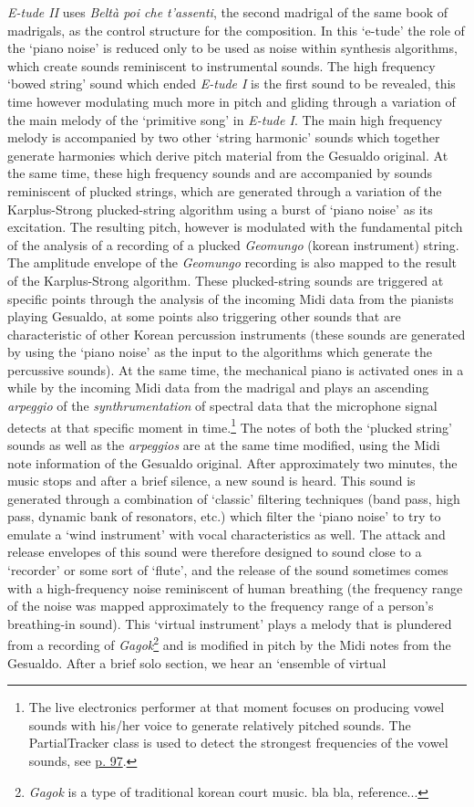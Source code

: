 \emph{E-tude II} uses \emph{Belt\`{a} poi che t'assenti}, the second madrigal of the same book of madrigals, as the control structure for the composition. In this `e-tude' the role of the `piano noise' is reduced only to be used as noise within synthesis algorithms, which create sounds reminiscent to instrumental sounds. The high frequency `bowed string' sound which ended \emph{E-tude I} is the first sound to be revealed, this time however modulating much more in pitch and gliding through a variation of the main melody of the `primitive song' in \emph{E-tude I}. The main high frequency melody is accompanied by two other `string harmonic' sounds which together generate harmonies which derive pitch material from the Gesualdo original. At the same time, these high frequency sounds and are accompanied by sounds reminiscent of plucked strings, which are generated through a variation of the Karplus-Strong plucked-string algorithm using a burst of `piano noise' as its excitation. The resulting pitch, however is modulated with the fundamental pitch of the analysis of a recording of a plucked \emph{Geomungo} (korean instrument) string. The amplitude envelope of the \emph{Geomungo} recording is also mapped to the result of the Karplus-Strong algorithm. These plucked-string sounds are triggered at specific points through the analysis of the incoming Midi data from the pianists playing Gesualdo, at some points also triggering other sounds that are characteristic of other Korean percussion instruments (these sounds are generated by using the `piano noise' as the input to the algorithms which generate the percussive sounds). At the same time, the mechanical piano is activated ones in a while by the incoming Midi data from the madrigal and plays an ascending \emph{arpeggio} of the \emph{synthrumentation} of spectral data that the microphone signal detects at that specific moment in time.\footnote{The live electronics performer at that moment focuses on producing vowel sounds with his/her voice to generate relatively pitched sounds. The PartialTracker class is used to detect the strongest frequencies of the vowel sounds, see \hyperlink{partrack}{p. 97}.} The notes of both the `plucked string' sounds as well as the \emph{arpeggios} are at the same time modified, using the Midi note information of the Gesualdo original. After approximately two minutes, the music stops and after a brief silence, a new sound is heard. This sound is generated through a combination of `classic' filtering techniques (band pass, high pass, dynamic bank of resonators, etc.) which filter the `piano noise' to try to emulate a `wind instrument' with vocal characteristics as well. The attack and release envelopes of this sound were therefore designed to sound close to a `recorder' or some sort of `flute', and the release of the sound sometimes comes with a high-frequency noise reminiscent of human breathing (the frequency range of the noise was mapped approximately to the frequency range of a person's breathing-in sound). This `virtual instrument' plays a melody that is plundered from a recording of \emph{Gagok}\footnote{\emph{Gagok} is a type of traditional korean court music. bla bla, reference...} and is modified in pitch by the Midi notes from the Gesualdo. After a brief solo section, we hear an `ensemble of virtual 